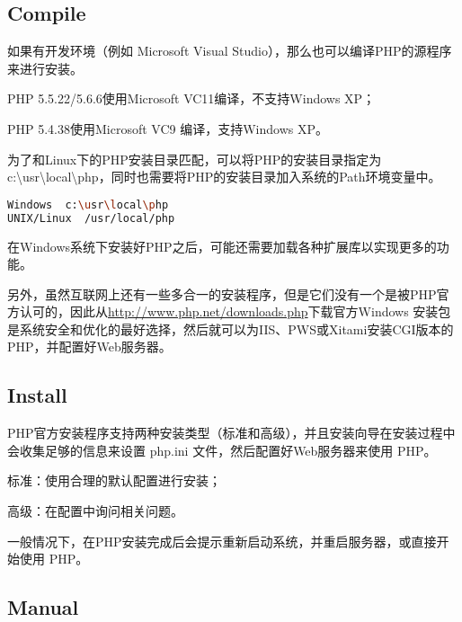 \subsection{Compile}

如果有开发环境（例如 Microsoft Visual Studio），那么也可以编译PHP的源程序来进行安装。

\begin{compactitem}
\item PHP 5.5.22/5.6.6使用Microsoft VC11编译，不支持Windows XP；
\item PHP 5.4.38使用Microsoft VC9 编译，支持Windows XP。
\end{compactitem}

为了和Linux下的PHP安装目录匹配，可以将PHP的安装目录指定为c:\textbackslash usr\textbackslash local\textbackslash php，同时也需要将PHP的安装目录加入系统的Path环境变量中。

\begin{lstlisting}[language=bash]
Windows  c:\usr\local\php
UNIX/Linux  /usr/local/php
\end{lstlisting}



在Windows系统下安装好PHP之后，可能还需要加载各种扩展库以实现更多的功能。

另外，虽然互联网上还有一些多合一的安装程序，但是它们没有一个是被PHP官方认可的，因此从\url{http://www.php.net/downloads.php}下载官方Windows 安装包是系统安全和优化的最好选择，然后就可以为IIS、PWS或Xitami安装CGI版本的PHP，并配置好Web服务器。

\subsection{Install}


PHP官方安装程序支持两种安装类型（标准和高级），并且安装向导在安装过程中会收集足够的信息来设置 php.ini 文件，然后配置好Web服务器来使用 PHP。


\begin{compactitem}
\item 标准：使用合理的默认配置进行安装；
\item 高级：在配置中询问相关问题。
\end{compactitem}

一般情况下，在PHP安装完成后会提示重新启动系统，并重启服务器，或直接开始使用 PHP。

\subsection{Manual}


